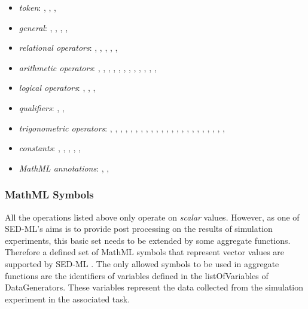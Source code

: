 \begin{itemize}\setlength{\parskip}{-0.1ex}

\item \emph{token}: , , ,
  
\item \emph{general}: , ,
  , ,  

\item \emph{relational operators}: , ,
  , , , 

\item \emph{arithmetic operators}: , ,
  , , , ,
  , , , ,
  , , 

\item \emph{logical operators}: , ,
  , 

\item \emph{qualifiers}: , ,

\item \emph{trigonometric operators}: , ,
  , , , ,
  , , , ,
  , , , ,
  , , , ,
  , , ,
  , , 

\item \emph{constants}: , ,
  , , ,

\item \emph{MathML annotations}: ,
  , 
\end{itemize}

\subsubsection{MathML Symbols}
All the operations listed above only operate on \emph{scalar} values. However, as one of SED-ML's aims is to provide post processing on the results of simulation experiments, this basic set needs to be extended by some aggregate functions. Therefore a defined set of MathML symbols that represent vector values are supported by SED-ML \currentLV. The only allowed symbols to be used in aggregate functions are the identifiers of variables defined in the listOfVariables of DataGenerators. These variables represent the data collected from the simulation experiment in the associated task. 

